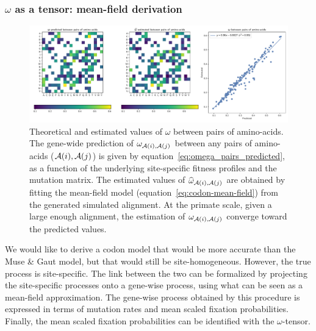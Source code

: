 \documentclass{article}
\begin{document}
\subsubsection{\texorpdfstring{$\omega$}{ω} as a tensor: mean-field derivation}

\begin{figure}[!htb]
    \centering
    \includegraphics[width=\linewidth, page=1]{inference_simulations/omega_MF}
    \caption[Estimation of fixation probability]{
        Theoretical and estimated values of $\omega$ between pairs of amino-acids.
        The gene-wide prediction of $\omega_{\mathcal{A}({i}), \mathcal{A}({j})}$ between any pairs of amino-acids ($\mathcal{A}({i}), \mathcal{A}({j})$) is given by equation~\ref{eq:omega_pairs_predicted}, as a function of the underlying site-specific fitness profiles and the mutation matrix.
        The estimated values of $\widehat{\omega}_{\mathcal{A}({i}), \mathcal{A}({j})}$ are obtained by fitting the mean-field model (equation~\ref{eq:codon-mean-field}) from the generated simulated alignment.
        At the primate scale, given a large enough alignment, the estimation of $\omega_{\mathcal{A}({i}), \mathcal{A}({j})}$ converge toward the predicted values.
    }
    \label{fig:omega-inference}
\end{figure}

We would like to derive a codon model that would be more accurate than the Muse \& Gaut model, but that would still be site-homogeneous.
However, the true process is site-specific.
The link between the two can be formalized by projecting the site-specific processes onto a gene-wise process, using what can be seen as a mean-field approximation.
The gene-wise process obtained by this procedure is expressed in terms of mutation rates and mean scaled fixation probabilities.
Finally, the mean scaled fixation probabilities can be identified with the $\omega$-tensor.
\end{document}
